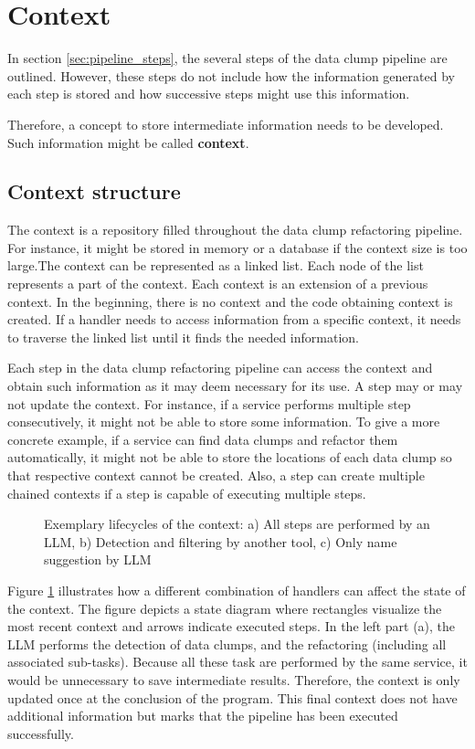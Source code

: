 \section{Context}\label{sec:context}
In section \ref{sec:pipeline_steps}, the several steps of the data clump pipeline are outlined. However, these steps do not include how the information generated by each step is stored and how successive steps might use this information.

Therefore, a concept to store intermediate information needs to be developed. Such information might be called \textbf{context}.
\subsection{Context structure}
The context is a repository filled throughout the data clump refactoring pipeline. For instance, it might be stored in memory or a database if the context size is too large.The context can be represented as a linked list. Each node of the list represents a part of the context.
Each context is an extension of a previous context. In the beginning, there is no context and the code obtaining context is created. If a handler needs to access information from a specific context, it needs to traverse the linked list until it finds the needed information. 


Each step in the data clump refactoring pipeline can access the context and obtain such information as it may deem necessary for its use. A step may or may not update the context. For instance, if a service performs multiple step consecutively, it might not be able to store some information. To give a more concrete example, if a service can find data clumps and refactor them automatically, it might not be able to store the locations of each data clump so that respective context cannot be created. Also, a step can create multiple chained contexts if a step is capable of executing multiple steps. 

\begin{figure}
   
\caption{Exemplary lifecycles of the context: a) All steps are performed by an \ac{LLM}, b) Detection and filtering by another tool, c) Only name suggestion by \ac{LLM}}
\label{fig:context_lifecycle}
\end{figure}

Figure \ref{fig:context_lifecycle} illustrates how a different combination of handlers can affect the state of the context. The figure depicts a state diagram where rectangles visualize the most recent context and arrows indicate executed steps.  In the left part (a), the \ac{LLM} performs the detection of data clumps, and the refactoring (including all associated sub-tasks). Because all these task are performed by the same service, it would be unnecessary to save intermediate results. Therefore, the context is only updated once at the conclusion of the program. This final context does not have additional information but marks that the pipeline has been executed successfully.
 


